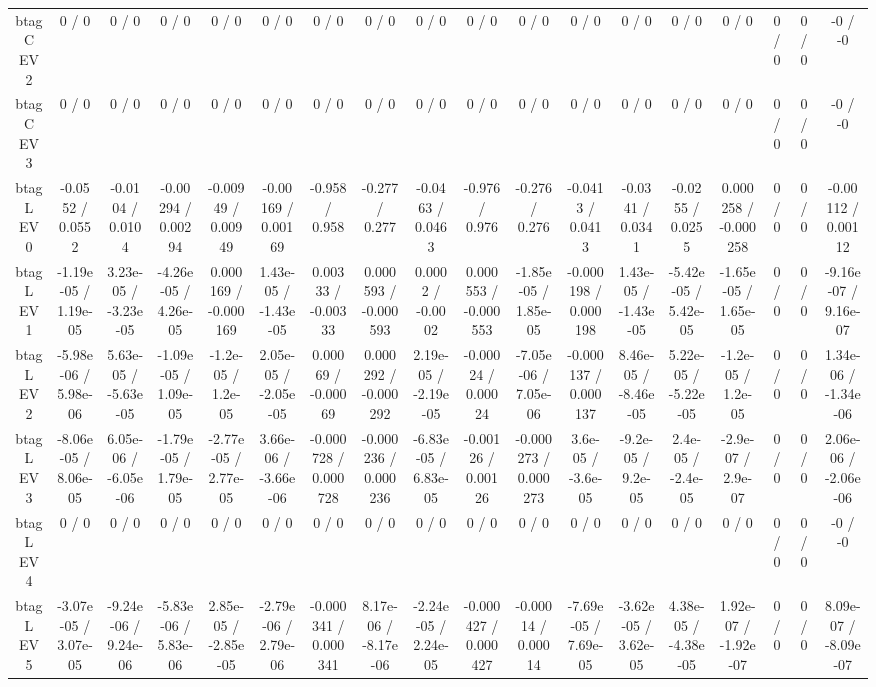 \documentclass[10pt]{article}
\begin{document}
\begin{table}[htbp]
\begin{center}
\begin{tabular}{|c|c|c|c|c|c|c|c|c|c|c|c|c|c|c|c|c|c|}
  btag C EV 2 & 0 / 0 & 0 / 0 & 0 / 0 & 0 / 0 & 0 / 0 & 0 / 0 & 0 / 0 & 0 / 0 & 0 / 0 & 0 / 0 & 0 / 0 & 0 / 0 & 0 / 0 & 0 / 0 & 0 / 0 & 0 / 0 & -0 / -0 \\ 
  btag C EV 3 & 0 / 0 & 0 / 0 & 0 / 0 & 0 / 0 & 0 / 0 & 0 / 0 & 0 / 0 & 0 / 0 & 0 / 0 & 0 / 0 & 0 / 0 & 0 / 0 & 0 / 0 & 0 / 0 & 0 / 0 & 0 / 0 & -0 / -0 \\ 
  btag L EV 0 & -0.0552 / 0.0552 & -0.0104 / 0.0104 & -0.00294 / 0.00294 & -0.00949 / 0.00949 & -0.00169 / 0.00169 & -0.958 / 0.958 & -0.277 / 0.277 & -0.0463 / 0.0463 & -0.976 / 0.976 & -0.276 / 0.276 & -0.0413 / 0.0413 & -0.0341 / 0.0341 & -0.0255 / 0.0255 & 0.000258 / -0.000258 & 0 / 0 & 0 / 0 & -0.00112 / 0.00112 \\ 
  btag L EV 1 & -1.19e-05 / 1.19e-05 & 3.23e-05 / -3.23e-05 & -4.26e-05 / 4.26e-05 & 0.000169 / -0.000169 & 1.43e-05 / -1.43e-05 & 0.00333 / -0.00333 & 0.000593 / -0.000593 & 0.0002 / -0.0002 & 0.000553 / -0.000553 & -1.85e-05 / 1.85e-05 & -0.000198 / 0.000198 & 1.43e-05 / -1.43e-05 & -5.42e-05 / 5.42e-05 & -1.65e-05 / 1.65e-05 & 0 / 0 & 0 / 0 & -9.16e-07 / 9.16e-07 \\ 
  btag L EV 2 & -5.98e-06 / 5.98e-06 & 5.63e-05 / -5.63e-05 & -1.09e-05 / 1.09e-05 & -1.2e-05 / 1.2e-05 & 2.05e-05 / -2.05e-05 & 0.00069 / -0.00069 & 0.000292 / -0.000292 & 2.19e-05 / -2.19e-05 & -0.00024 / 0.00024 & -7.05e-06 / 7.05e-06 & -0.000137 / 0.000137 & 8.46e-05 / -8.46e-05 & 5.22e-05 / -5.22e-05 & -1.2e-05 / 1.2e-05 & 0 / 0 & 0 / 0 & 1.34e-06 / -1.34e-06 \\ 
  btag L EV 3 & -8.06e-05 / 8.06e-05 & 6.05e-06 / -6.05e-06 & -1.79e-05 / 1.79e-05 & -2.77e-05 / 2.77e-05 & 3.66e-06 / -3.66e-06 & -0.000728 / 0.000728 & -0.000236 / 0.000236 & -6.83e-05 / 6.83e-05 & -0.00126 / 0.00126 & -0.000273 / 0.000273 & 3.6e-05 / -3.6e-05 & -9.2e-05 / 9.2e-05 & 2.4e-05 / -2.4e-05 & -2.9e-07 / 2.9e-07 & 0 / 0 & 0 / 0 & 2.06e-06 / -2.06e-06 \\ 
  btag L EV 4 & 0 / 0 & 0 / 0 & 0 / 0 & 0 / 0 & 0 / 0 & 0 / 0 & 0 / 0 & 0 / 0 & 0 / 0 & 0 / 0 & 0 / 0 & 0 / 0 & 0 / 0 & 0 / 0 & 0 / 0 & 0 / 0 & -0 / -0 \\ 
  btag L EV 5 & -3.07e-05 / 3.07e-05 & -9.24e-06 / 9.24e-06 & -5.83e-06 / 5.83e-06 & 2.85e-05 / -2.85e-05 & -2.79e-06 / 2.79e-06 & -0.000341 / 0.000341 & 8.17e-06 / -8.17e-06 & -2.24e-05 / 2.24e-05 & -0.000427 / 0.000427 & -0.00014 / 0.00014 & -7.69e-05 / 7.69e-05 & -3.62e-05 / 3.62e-05 & 4.38e-05 / -4.38e-05 & 1.92e-07 / -1.92e-07 & 0 / 0 & 0 / 0 & 8.09e-07 / -8.09e-07 \\ 

\end{tabular}
\end{center}
\end{table}
\end{document}
